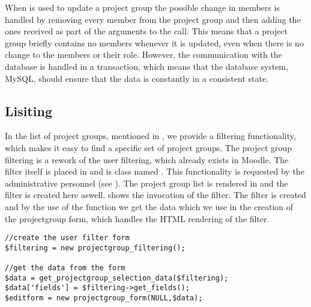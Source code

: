 When  is used to update a project group the possible change in members is handled by removing every member from the project group and then adding the ones received as part of the arguments to the call.
This means that a project group briefly contains no members whenever it is updated, even when there is no change to the members or their role.
However, the communication with the database is handled in a transaction, which means that the database system, MySQL, should ensure that the data is constantly in a consistent state.

\subsection{Lisiting}
In the list of project groups, mentioned in , we provide a filtering functionality, which makes it easy to find a specific set of project groups.
The project group filtering is a rework of the user filtering, which already exists in Moodle.
The filter itself is placed in  and is class named .
This functionality is requested by the administrative personnel (see ).
The project group list is rendered in  and the filter is created here aswell. 
 shows the invocation of the filter. 
The filter is created and by the use of the function  we get the data which we use in the creation of the projectgroup form, which handles the HTML rendering of the filter. 
\begin{lstlisting}[style=phpCode, caption=\myCaption{The invocation of the filtering mechanism}, label=moodlefiltering]
//create the user filter form
$filtering = new projectgroup_filtering();

//get the data from the form
$data = get_projectgroup_selection_data($filtering);
$data['fields'] = $filtering->get_fields();
$editform = new projectgroup_form(NULL,$data);
\end{lstlisting}\begin{comment}$\end{comment}

